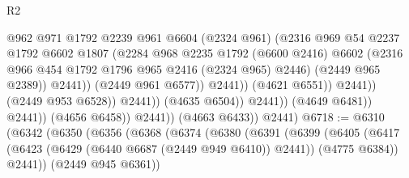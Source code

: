 \begin{lexlean}{R2}
\begin{coremodule}
                                              @962
                                              @971
                                              @1792
                                              @2239
                                              @961
                                              @6604
                                              (@2324 @961)
                                              (@2316
                                                @969
                                                @54
                                                @2237
                                                @1792
                                                @6602
                                                @1807
                                                (@2284
                                                  @968
                                                  @2235
                                                  @1792
                                                  (@6600 @2416)
                                                  @6602
                                                  (@2316
                                                    @966
                                                    @454
                                                    @1792
                                                    @1796
                                                    @965
                                                    @2416
                                                    (@2324 @965)
                                                    @2446)
                                                  (@2449 @965 @2389))
                                                @2441))
                                            (@2449 @961 @6577))
                                          @2441))
                                      (@4621 @6551))
                                    @2441))
                                (@2449 @953 @6528))
                              @2441))
                          (@4635 @6504))
                        @2441))
                    (@4649 @6481))
                  @2441))
              (@4656 @6458))
            @2441))
        (@4663 @6433))
      @2441)
@6718 := @6310
    (@6342
      (@6350
        (@6356
          (@6368
            (@6374
              (@6380
                (@6391
                  (@6399
                    (@6405
                      (@6417 (@6423 (@6429 (@6440 @6687 (@2449 @949 @6410)) @2441)) (@4775 @6384))
                      @2441))
                  (@2449 @945 @6361))

\end{coremodule}
\end{lexlean}
